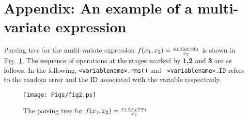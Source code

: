 \documentclass[acmtoms,acmnow]{acmtrans2m}
\begin{document}
\section{Appendix: An example of a multi-variate expression}
\label{APPEN:EX}
Parsing tree for the multi-variate expression $f(x_1,x_2)={x_1\times
x_2+x_1 \over {x_2}}$ is shown in Fig.~\ref{EX2}.  The sequence of
operations at the stages marked by {\bf 1,2} and {\bf 3} are as
follows.  In the following, {\tt <variablename>.rms()} and {\tt
<variablename>.ID} refers to the random error and the ID associated
with the variable respectively.
\begin{figure}[t]
\begin{center}
  \texttt{[image: Figs/fig2.ps]}
\caption[]{The parsing tree for $f(x_1,x_2)={x_1\times x_2+x_1 \over {x_2}}$}
\label{EX2}
\end{center}
\end{figure}
\end{document}
